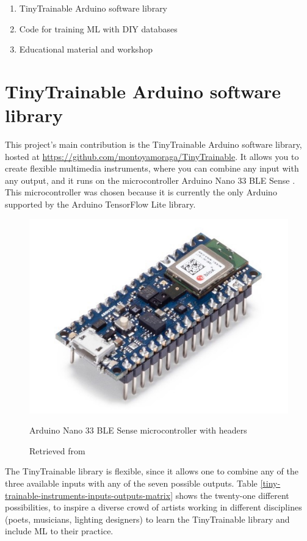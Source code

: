 \begin{enumerate}
  \item TinyTrainable Arduino software library
  \item Code for training \acrshort{ML} with \acrshort{DIY} databases
  \item Educational material and workshop
\end{enumerate}

\section{TinyTrainable Arduino software library}

This project's main contribution is the TinyTrainable Arduino software library,  hosted at \url{https://github.com/montoyamoraga/TinyTrainable}. It allows you to create flexible multimedia instruments, where you can combine any input with any output, and it runs on the microcontroller Arduino Nano 33 BLE Sense \cite{website-materials-arduino-nano-33-ble-sense}. This microcontroller was chosen because it is currently the only Arduino supported by the Arduino TensorFlow Lite library.

\begin{figure}[ht]
  \centering
  \includegraphics[width=0.75\linewidth,height=0.30\textheight,keepaspectratio]{images/materials-arduino-nano-33-ble-sense.jpg}
  \caption{Arduino Nano 33 \acrshort{BLE} Sense microcontroller with headers}
  \caption*{Retrieved from \cite{website-materials-arduino-nano-33-ble-sense}}
  \label{fig:materials-arduino-nano-33-ble-sense}
\end{figure}

The TinyTrainable library is flexible, since it allows one to combine any of the three available inputs with any of the seven possible outputs. Table \ref{tiny-trainable-instruments-inputs-outputs-matrix} shows the twenty-one different possibilities, to inspire a diverse crowd of artists working in different disciplines (poets, musicians, lighting designers) to learn the TinyTrainable library and include \acrshort{ML} to their practice.

